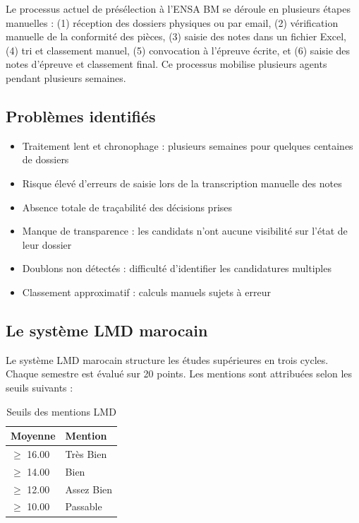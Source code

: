 Le processus actuel de présélection à l'ENSA BM se déroule en plusieurs étapes manuelles : (1) réception des dossiers physiques ou par email, (2) vérification manuelle de la conformité des pièces, (3) saisie des notes dans un fichier Excel, (4) tri et classement manuel, (5) convocation à l'épreuve écrite, et (6) saisie des notes d'épreuve et classement final. Ce processus mobilise plusieurs agents pendant plusieurs semaines.

\subsection{Problèmes identifiés}
\label{problemes-identifies}

\begin{itemize}
  \item Traitement lent et chronophage : plusieurs semaines pour quelques centaines de dossiers
  \item Risque élevé d'erreurs de saisie lors de la transcription manuelle des notes
  \item Absence totale de traçabilité des décisions prises
  \item Manque de transparence : les candidats n'ont aucune visibilité sur l'état de leur dossier
  \item Doublons non détectés : difficulté d'identifier les candidatures multiples
  \item Classement approximatif : calculs manuels sujets à erreur
\end{itemize}

\subsection{Le système LMD marocain}
\label{le-systeme-lmd-marocain}

Le système LMD marocain structure les études supérieures en trois cycles. Chaque semestre est évalué sur 20 points. Les mentions sont attribuées selon les seuils suivants :

\begin{table}[htbp]
  \centering
  \caption{Seuils des mentions LMD}
  \begin{tabular}{@{} l l @{}}
    \toprule
    \textbf{Moyenne} & \textbf{Mention} \\
    \midrule
    $\ge$ 16.00 & Très Bien \\
    $\ge$ 14.00 & Bien \\
    $\ge$ 12.00 & Assez Bien \\
    $\ge$ 10.00 & Passable \\
    \bottomrule
  \end{tabular}
  \label{tab:mentions-lmd}
\end{table}

